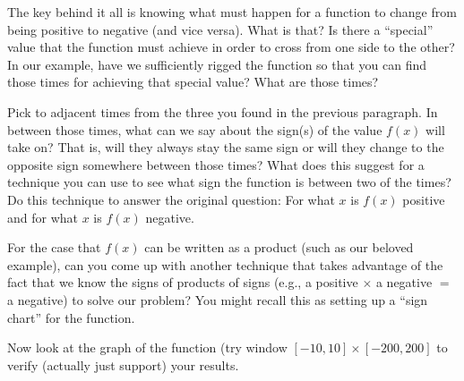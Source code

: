 \documentclass{ximera}
\begin{document}
The key behind it all is knowing what must happen for a function to change from being positive to negative (and vice versa).  What is that?  Is there a ``special'' value that the function must achieve in order to cross from one side to the other?  In our example, have we sufficiently rigged the function so that you can find those times for achieving that special value?  What are those times?

Pick to adjacent times from the three you found in the previous paragraph.  In between those times, what can we say about the sign(s) of the value $f(x)$ will take on?  That is, will they always stay the same sign or will they change to the opposite sign somewhere between those times?  What does this suggest for a technique you can use to see what sign the function is between two of the times?  Do this technique to answer the original question: For what $x$ is $f(x)$ positive and for what $x$ is $f(x)$ negative.

For the case that $f(x)$ can be written as a product (such as our beloved example), can you come up with another technique that takes advantage of the fact that we know the signs of products of signs (e.g., a positive $\times$ a negative $=$ a negative) to solve our problem?  You might recall this as setting up a ``sign chart'' for the function.

Now look at the graph of the function (try window $[-10, 10]\times [-200, 200]$ to verify (actually just support) your results.
\end{document}
